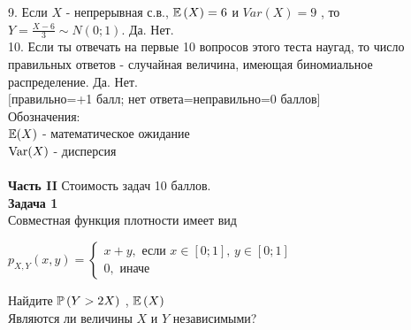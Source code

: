 \documentclass[12pt, a4paper]{article}\usepackage[]{graphicx}\usepackage[]{color}
\begin{document}
	9. Если  $X$  - непрерывная с.в.,  $\E\left(X\right)=6$  и
	$Var\left(X\right)=9$ , то  $Y=\frac{X-6}{3} \sim
	N\left(0;1\right)$.  Да. Нет. \\

	10. Если ты отвечать на первые 10 вопросов этого теста наугад, то
	число правильных ответов - случайная величина, имеющая
	биномиальное распределение. Да. Нет. \\



	$[$правильно=+1 балл; нет ответа=неправильно=0 баллов$]$ \\
	Обозначения: \\
	$\E(X)$ - математическое ожидание \\
	$\Var(X)$ - дисперсия \\ \\

	\textbf{Часть II} Стоимость задач 10 баллов. \\





	\textbf{Задача 1} \\ %
	Совместная функция плотности имеет вид

	$p_{X,Y} \left(x,y\right)=
	\left\{
	\begin{array}{l}
	{x+y, \text{ если } x\in \left[0;1\right],\, y\in \left[0;1\right]} \\
	{0,\text{ иначе} }
	\end{array}\right. $

	Найдите  $\P\left(Y>2X\right)$ ,  $\E\left(X\right)$ \\
	Являются ли величины $X$ и $Y$ независимыми? \\
\end{document}
